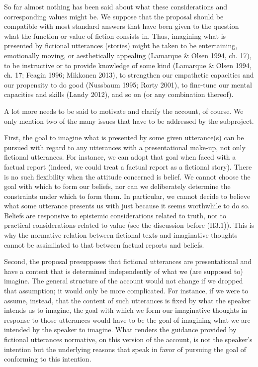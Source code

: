 So far almost nothing has been said about what these considerations and corresponding values might be. We suppose that the proposal should be compatible with most standard answers that have been given to the question what the function or value of fiction consists in. Thus, imagining what is presented by fictional utterances (stories) might be taken to be entertaining, emotionally moving, or aesthetically appealing (Lamarque \& Olsen 1994, ch. 17), to be instructive or to provide knowledge of some kind (Lamarque \& Olsen 1994, ch. 17; Feagin 1996; Mikkonen 2013), to strengthen our empathetic capacities and our propensity to do good (Nussbaum 1995; Rorty 2001), to fine-tune our mental capacities and skills (Landy 2012), and so on (or any combination thereof).

A lot more needs to be said to motivate and clarify the account, of course. We only mention two of the many issues that have to be addressed by the subproject.

First, the goal to imagine what is presented by some given utterance(s) can be pursued with regard to any utterances with a presentational make-up, not only fictional utterances. For instance, we can adopt that goal when faced with a factual report (indeed, we could treat a factual report as a fictional story). There is no such flexibility when the attitude concerned is belief. We cannot choose the goal with which to form our beliefs, nor can we deliberately determine the constraints under which to form them. In particular, we cannot decide to believe what some utterance presents us with just because it seems worthwhile to do so. Beliefs are responsive to epistemic considerations related to truth, not to practical considerations related to value (see the discussion before (H3.1)). This is why the normative relation between fictional texts and imaginative thoughts cannot be assimilated to that between factual reports and beliefs.

Second, the proposal presupposes that fictional utterances are presentational and have a content that is determined independently of what we (are supposed to) imagine. The general structure of the account would not change if we dropped that assumption; it would only be more complicated. For instance, if we were to assume, instead, that the content of such utterances is fixed by what the speaker intends us to imagine, the goal with which we form our imaginative thoughts in response to those utterances would have to be the goal of imagining what we are intended by the speaker to imagine. What renders the guidance provided by fictional utterances normative, on this version of the account, is not the speaker's intention but the underlying reasons that speak in favor of pursuing the goal of conforming to this intention.


